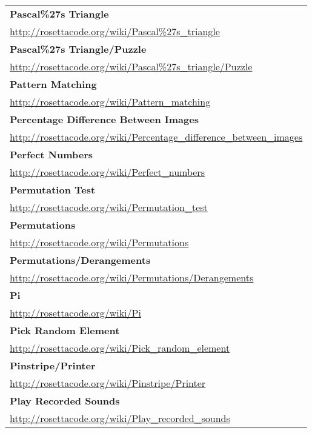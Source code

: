 \begin{longtable}{l}
\textbf{
Pascal\%27s Triangle } \\ \href{http://rosettacode.org/wiki/Pascal\%27s\_triangle}{http://rosettacode.org/wiki/Pascal\%27s\_triangle} \\
\textbf{Pascal\%27s Triangle/Puzzle } \\ \href{http://rosettacode.org/wiki/Pascal\%27s\_triangle/Puzzle}{http://rosettacode.org/wiki/Pascal\%27s\_triangle/Puzzle} \\
\textbf{Pattern Matching } \\ \href{http://rosettacode.org/wiki/Pattern\_matching}{http://rosettacode.org/wiki/Pattern\_matching} \\
\textbf{
Percentage Difference Between Images } \\ \href{http://rosettacode.org/wiki/Percentage\_difference\_between\_images}{http://rosettacode.org/wiki/Percentage\_difference\_between\_images} \\
\textbf{Perfect Numbers } \\ \href{http://rosettacode.org/wiki/Perfect\_numbers}{http://rosettacode.org/wiki/Perfect\_numbers} \\
\textbf{
Permutation Test } \\ \href{http://rosettacode.org/wiki/Permutation\_test}{http://rosettacode.org/wiki/Permutation\_test} \\
\textbf{Permutations } \\ \href{http://rosettacode.org/wiki/Permutations}{http://rosettacode.org/wiki/Permutations} \\
\textbf{Permutations/Derangements } \\ \href{http://rosettacode.org/wiki/Permutations/Derangements}{http://rosettacode.org/wiki/Permutations/Derangements} \\
\textbf{Pi } \\ \href{http://rosettacode.org/wiki/Pi}{http://rosettacode.org/wiki/Pi} \\
\textbf{
Pick Random Element } \\ \href{http://rosettacode.org/wiki/Pick\_random\_element}{http://rosettacode.org/wiki/Pick\_random\_element} \\
\textbf{Pinstripe/Printer } \\ \href{http://rosettacode.org/wiki/Pinstripe/Printer}{http://rosettacode.org/wiki/Pinstripe/Printer} \\
\textbf{Play Recorded Sounds } \\ \href{http://rosettacode.org/wiki/Play\_recorded\_sounds}{http://rosettacode.org/wiki/Play\_recorded\_sounds} \\

\end{longtable}
